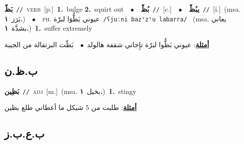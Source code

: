 \documentclass[10pt,a4paper,twoside]{article} %
\begin{document}
\begin{multicols}{2}
{\setlength\topsep{0pt}\textbf{\foreignlanguage{arabic}{بَظّ}}\ {\color{gray}\texttt{//}\color{black}}\ \textsc{verb}\ [p.]\ \textbf{1.}~bulge  \textbf{2.}~squirt out\ \ $\bullet$\ \ \setlength\topsep{0pt}\textbf{\foreignlanguage{arabic}{بُظّ}}\ {\color{gray}\texttt{//}\color{black}}\ [c.]\ \ $\bullet$\ \ \setlength\topsep{0pt}\textbf{\foreignlanguage{arabic}{يبُظّ}}\ {\color{gray}\texttt{//}\color{black}}\ [i.]\ \color{gray}(msa. \foreignlanguage{arabic}{بَرَز}~\foreignlanguage{arabic}{\textbf{١.}})\color{black}\ \ $\bullet$\ \ \textsc{ph.} \color{gray} \foreignlanguage{arabic}{عيوني بَظُّوَا لبرّة}\color{black}\ {\color{gray}\texttt{/{\sffamily ʕjuːni bazˤzˤu labarra}/}\color{black}}\ \color{gray} (msa. \foreignlanguage{arabic}{يعاني بشدَّة}~\foreignlanguage{arabic}{\textbf{١.}})\color{black}\ \textbf{1.}~suffer extremely\  \begin{flushright}\color{gray}\foreignlanguage{arabic}{\textbf{\underline{\foreignlanguage{arabic}{أمثلة}}}: عيوني بَظُّوا لبرّة تإِجاني شقفة هالولد\ $\bullet$\ \  بَظّت البرتقالة من الجيبة}\end{flushright}\color{black}} \vspace{2mm}

\vspace{-3mm}
\subsection*{\color{blue}\foreignlanguage{arabic}{ب.ظ.ن}\color{blue}{ (ntws)}} 

{\setlength\topsep{0pt}\textbf{\foreignlanguage{arabic}{بَظِين}}\ {\color{gray}\texttt{//}\color{black}}\ \textsc{adj}\ [m.]\ \color{gray}(msa. \foreignlanguage{arabic}{بخيل}~\foreignlanguage{arabic}{\textbf{١.}})\color{black}\ \textbf{1.}~stingy\  \begin{flushright}\color{gray}\foreignlanguage{arabic}{\textbf{\underline{\foreignlanguage{arabic}{أمثلة}}}: طلبت من 5 شيكل ما أعطاني طلع بظين}\end{flushright}\color{black}} \vspace{2mm}

\vspace{-3mm}
\subsection*{\color{blue}\foreignlanguage{arabic}{ب.ع.ب.ز}\color{blue}{}} 


\end{multicols}
\end{document}
